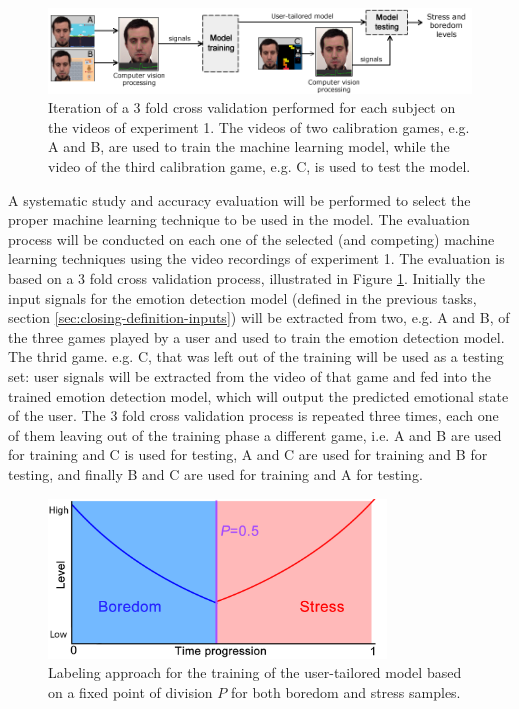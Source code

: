 \begin{figure}[h]
    \centering
    \includegraphics[width=\textwidth]{figures/machine-learning-investigation.png}
    \caption{Iteration of a 3 fold cross validation performed for each subject on the videos of experiment 1. The videos of two calibration games, e.g. A and B, are used to train the machine learning model, while the video of the third calibration game, e.g. C, is used to test the model.}
    \label{fig:machine-learning-investigation}
\end{figure}

A systematic study and accuracy evaluation will be performed to select the proper machine learning technique to be used in the model. The evaluation process will be conducted on each one of the selected (and competing) machine learning techniques using the video recordings of experiment 1. The evaluation is based on a 3 fold cross validation process, illustrated in Figure \ref{fig:machine-learning-investigation}. Initially the input signals for the emotion detection model (defined in the previous tasks, section \ref{sec:closing-definition-inputs}) will be extracted from two, e.g. A and B, of the three games played by a user and used to train the emotion detection model. The thrid game. e.g. C, that was left out of the training will be used as a testing set: user signals will be extracted from the video of that game and fed into the trained emotion detection model, which will output the predicted emotional state of the user. The 3 fold cross validation process is repeated three times, each one of them leaving out of the training phase a different game, i.e. A and B are used for training and C is used for testing, A and C are used for training and B for testing, and finally B and C are used for training and A for testing.

\begin{figure}[h]
    \centering
    \includegraphics[width=0.8\textwidth]{figures/machine-learning-labeling-approach-A.png}
    \caption{Labeling approach for the training of the user-tailored model based on a fixed point of division $P$ for both boredom and stress samples.}
    \label{fig:machine-learning-labeling-approach-A}
\end{figure}

